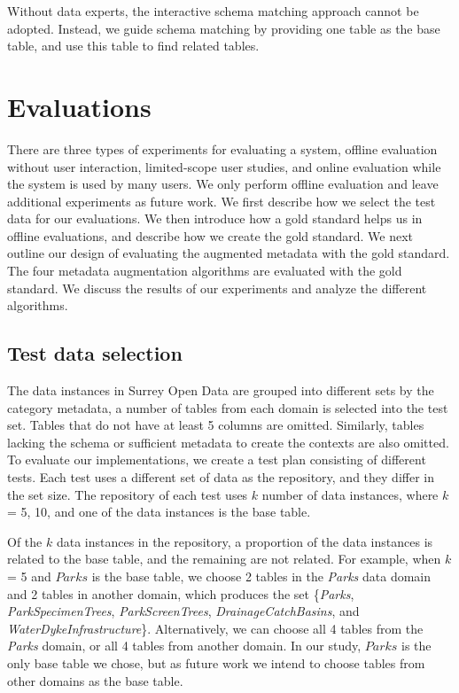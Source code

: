 Without data experts, the interactive schema matching approach cannot be adopted. Instead, we guide schema matching by providing one table as the base table, and use this table to find related tables.

\section{Evaluations}
\label{sec:Evaluations}

There are three types of experiments for evaluating a system, offline evaluation without user interaction, limited-scope user studies, and online evaluation while the system is used by many users. We only perform offline evaluation and leave additional experiments as future work. We first describe how we select the test data for our evaluations. We then introduce how a gold standard helps us in offline evaluations, and describe how we create the gold standard. We next outline our design of evaluating the augmented metadata with the gold standard. The four metadata augmentation algorithms are evaluated with the gold standard. We discuss the results of our experiments and analyze the different algorithms.

\subsection{Test data selection}
\label{ssec:TestDataSelection}

The data instances in Surrey Open Data are grouped into different sets by the category metadata, a number of tables from each domain is selected into the test set. Tables that do not have at least 5 columns are omitted. Similarly, tables lacking the schema or sufficient metadata to create the contexts are also omitted. To evaluate our implementations, we create a test plan consisting of different tests. Each test uses a different set of data as the repository, and they differ in the set size. The repository of each test uses $k$ number of data instances, where $k$ = 5, 10, and one of the data instances is the base table.

Of the $k$ data instances in the repository, a proportion of the data instances is related to the base table, and the remaining are not related. For example, when $k$ = 5 and $Parks$ is the base table, we choose 2 tables in the \textit{Parks} data domain and 2 tables in another domain, which produces the set \{\textit{Parks}, \textit{ParkSpecimenTrees}, \textit{ParkScreenTrees}, \textit{DrainageCatchBasins}, and \textit{WaterDykeInfrastructure}\}. Alternatively, we can choose all 4 tables from the \textit{Parks} domain, or all 4 tables from another domain. In our study, $Parks$ is the only base table we chose, but as future work we intend to choose tables from other domains as the base table.

